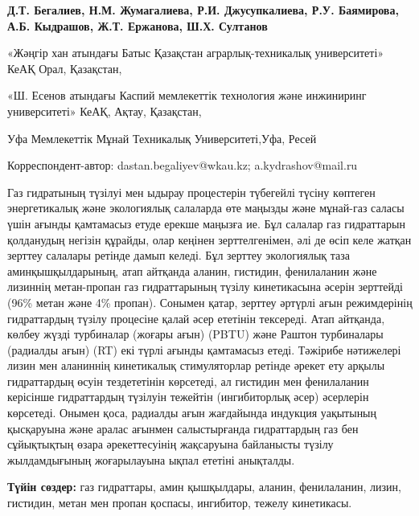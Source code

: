 
\begin{header}

{\bfseries
{}Д.Т. Бегалиев\envelope,
Н.М. Жумагалиева,
Р.И. Джусупкалиева,
Р.У. Баямирова,
А.Б. Кыдрашов\envelope,
Ж.Т. Ержанова,
Ш.Х. Султанов
}
\end{header}

\begin{affil}
«Жәңгір хан атындағы Батыс Қазақстан аграрлық-техникалық университеті» КеАҚ Орал, Қазақстан,

«Ш. Есенов атындағы Каспий мемлекеттік технология және инжиниринг университеті» КеАҚ, Ақтау, Қазақстан,

Уфа Мемлекеттік Мұнай Техникалық Университеті,Уфа, Ресей

\envelope Корреспондент-автор: dastan.begaliyev@wkau.kz; a.kydrashov@mail.ru
\end{affil}

Газ гидратының түзілуі мен ыдырау процестерін түбегейлі түсіну көптеген
энергетикалық және экологиялық салаларда өте маңызды және мұнай-газ
саласы үшін ағынды қамтамасыз етуде ерекше маңызға ие. Бұл салалар газ
гидраттарын қолданудың негізін құрайды, олар кеңінен зерттелгенімен, әлі
де өсіп келе жатқан зерттеу салалары ретінде дамып келеді. Бұл зерттеу
экологиялық таза аминқышқылдарының, атап айтқанда аланин, гистидин,
фенилаланин және лизиннің метан-пропан газ гидраттарының түзілу
кинетикасына әсерін зерттейді (96\% метан және 4\% пропан). Сонымен
қатар, зерттеу әртүрлі ағын режимдерінің гидраттардың түзілу процесіне
қалай әсер ететінін тексереді. Атап айтқанда, көлбеу жүзді турбиналар
(жоғары ағын) (PBTU) және Раштон турбиналары (радиалды ағын) (RT) екі
түрлі ағынды қамтамасыз етеді. Тәжірибе нәтижелері лизин мен аланиннің
кинетикалық стимуляторлар ретінде әрекет ету арқылы гидраттардың өсуін
тездететінін көрсетеді, ал гистидин мен фенилаланин керісінше
гидраттардың түзілуін тежейтін (ингибиторлық әсер) әсерлерін көрсетеді.
Онымен қоса, радиалды ағын жағдайында индукция уақытының қысқаруына және
аралас ағынмен салыстырғанда гидраттардың газ бен сұйықтықтың өзара
әрекеттесуінің жақсаруына байланысты түзілу жылдамдығының жоғарылауына
ықпал ететіні анықталды.

{\bfseries Түйін сөздер:} газ гидраттары, амин қышқылдары, аланин,
фенилаланин, лизин, гистидин, метан мен пропан қоспасы, ингибитор,
тежелу кинетикасы.

